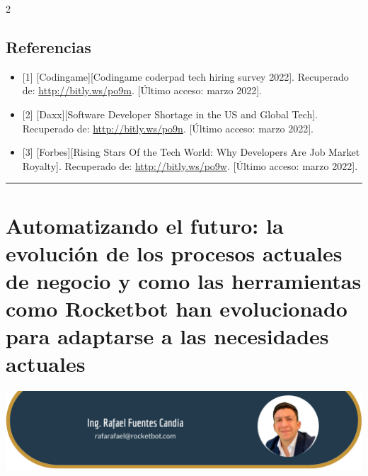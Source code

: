 \documentclass[12pt,spanish,Letterpaper,openany]{book}
\newcommand{\HRule}{\begin{center}\rule{0.5\linewidth}{0.2mm}\end{center}}
\begin{document}
\begin {multicols}{2}
\begin {flushleft}
\begin{minipage}[c]{\columnwidth}
\end{minipage}
\end {flushleft}

\hypertarget{referencias-12}{%
\section{Referencias}\label{referencias-12}}

\begin{itemize}
\item
  {[}1{]} {[}Codingame{]}{[}Codingame coderpad tech hiring survey 2022{]}. Recuperado de: \url{http://bitly.ws/po9m}. {[}Último acceso: marzo 2022{]}.
\item
  {[}2{]} {[}Daxx{]}{[}Software Developer Shortage in the US and Global Tech{]}. Recuperado de: \url{http://bitly.ws/po9n}. {[}Último acceso: marzo 2022{]}.
\item
  {[}3{]} {[}Forbes{]}{[}Rising Stars Of the Tech World: Why Developers Are Job Market Royalty{]}. Recuperado de: \url{http://bitly.ws/po9w}. {[}Último acceso: marzo 2022{]}.
\end{itemize}

\end {multicols}
\medskip
\HRule
\medskip

\hypertarget{rafaelfuentes}{%
\chapter{Automatizando el futuro: la evolución de los procesos actuales de negocio y como las herramientas como Rocketbot han evolucionado para adaptarse a las necesidades actuales}\label{rafaelfuentes}}

\begin{center}\includegraphics[width=1\linewidth]{images/rFuentes_image1} \end{center}
\end{document}

